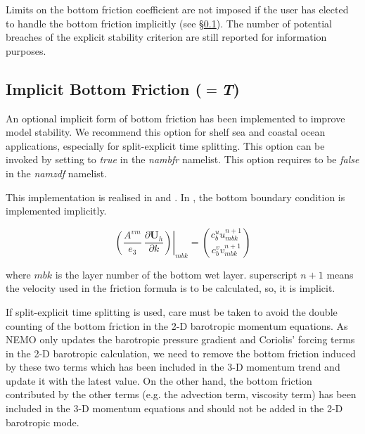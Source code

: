 \documentclass[NEMO_book]{subfiles}
\begin{document}
Limits on the bottom friction coefficient are not imposed if the user has elected to
handle the bottom friction implicitly (see \S\ref{ZDF_bfr_imp}). The number of potential
breaches of the explicit stability criterion are still reported for information purposes.

\subsection{Implicit Bottom Friction ($=$\textit{T})}
\label{ZDF_bfr_imp}

An optional implicit form of bottom friction has been implemented to improve
model stability. We recommend this option for shelf sea and coastal ocean applications, especially 
for split-explicit time splitting. This option can be invoked by setting  
to \textit{true} in the \textit{nambfr} namelist. This option requires  to be \textit{false} 
in the \textit{namzdf} namelist. 

This implementation is realised in  and . In , the 
bottom boundary condition is implemented implicitly.

\begin{equation} \label{Eq_dynzdf_bfr}
\left.{\left( {\frac{A^{vm} }{e_3 }\ \frac{\partial \textbf{U}_h}{\partial k}} \right)} \right|_{mbk}
	 = \binom{c_{b}^{u}u^{n+1}_{mbk}}{c_{b}^{v}v^{n+1}_{mbk}}
\end{equation}

where $mbk$ is the layer number of the bottom wet layer. superscript $n+1$ means the velocity used in the
friction formula is to be calculated, so, it is implicit.

If split-explicit time splitting is used, care must be taken to avoid the double counting of
the bottom friction in the 2-D barotropic momentum equations. As NEMO only updates the barotropic 
pressure gradient and Coriolis' forcing terms in the 2-D barotropic calculation, we need to remove
the bottom friction induced by these two terms which has been included in the 3-D momentum trend 
and update it with the latest value. On the other hand, the bottom friction contributed by the
other terms (e.g. the advection term, viscosity term) has been included in the 3-D momentum equations
and should not be added in the 2-D barotropic mode.
\end{document}
